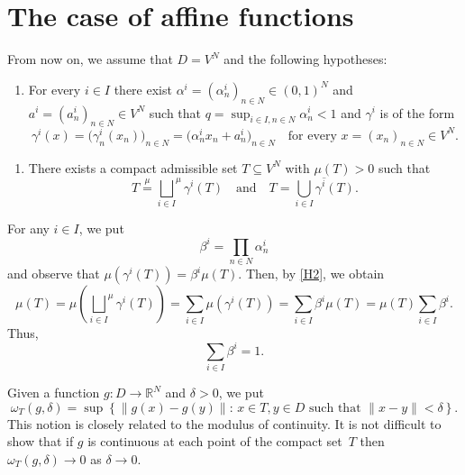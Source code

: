 \documentclass{amsart}
\theoremstyle{plain}%
\theoremstyle{definition}
\theoremstyle{remark}
\newcommand{\meq}{\mathop{=}\limits^{\mu}}
\begin{document}
\section{The case of affine functions}\label{section9}
From now on, we assume that $D=V^N$ and the following hypotheses:
\begin{enumerate}[label={\rm (H$_1$)}]
\item\label{H1} For every $i\in I$ there exist $\alpha^i=(\alpha^i_n)_{n\in N}\in(0,1)^N$ and $a^i=(a^i_n)_{n\in N}\in V^N$ such that $q=\sup_{i\in I,n\in N}\alpha^i_n<1$ and $\gamma^i$ is of the form
\begin{equation*}
\gamma^i(x)=\big(\gamma^i_n(x_n)\big)_{n\in N}=\big(\alpha^i_nx_n+a^i_n\big)_{n\in N}
\quad\text{for every }x=(x_n)_{n\in N}\in V^N.
\end{equation*}
\end{enumerate}
\begin{enumerate}[label={\rm (H$_2$)}]
\item\label{H2} There exists a compact admissible set $T\subseteq V^N$ with $\mu(T)>0$ such that
\begin{equation*}
T\meq{\bigsqcup_{i\in I}}^\mu \gamma^i(T)\quad\text{and}\quad
T=\overline{\bigcup_{i\in I}\gamma^i(T)}.
\end{equation*}
\end{enumerate}

For any $i\in I$, we put
\begin{equation*}
\beta^i=\prod\limits_{n\in N}\alpha^i_n
\end{equation*}
and observe that $\mu(\gamma^i(T))=\beta^i\mu(T)$. Then, by \ref{H2}, we obtain
\begin{equation*}
\mu(T)=\mu\left({\bigsqcup\limits_{i\in I}}^\mu \gamma^i(T)\right)
=\sum_{i\in I}\mu(\gamma^i(T))=\sum_{i\in I}\beta^i\mu(T)=\mu(T)\sum_{i\in I}\beta^i.
\end{equation*}
Thus,
\begin{equation}\label{equ:Acond5}
\sum_{i\in I}\beta^i=1.
\end{equation}

Given a function  $g\colon D\to\mathbb{R}^N$ and $\delta>0$, we put
\begin{equation*}
\omega_T(g,\delta)=\sup\left\{\|g(x)-g(y)\|:\,
x\in T,y\in D\text{ such that  }\|x-y\|<\delta\right\}.
\end{equation*}
This notion is closely related to the modulus of continuity. It is not difficult to show that if $g$ is continuous at each point of the compact set~$T$ then $\omega_T(g,\delta)\to 0$ as $\delta\to 0$.
\end{document}
